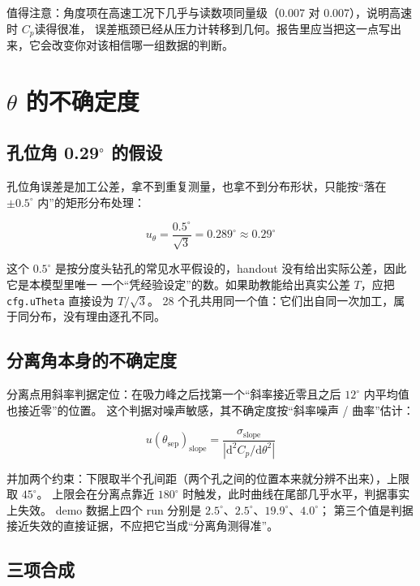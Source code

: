 \documentclass[11pt,a4paper]{ctexart}
\newcommand{\Cp}{\ensuremath{C_p}}
\begin{document}
值得注意：角度项在高速工况下几乎与读数项同量级（0.007 对 0.007），说明高速时 \Cp 读得很准，
误差瓶颈已经从压力计转移到几何。报告里应当把这一点写出来，它会改变你对该相信哪一组数据的判断。

\section{$\theta$ 的不确定度}
\label{sec:theta}

\subsection{孔位角 0.29$^\circ$ 的假设}

孔位角误差是加工公差，拿不到重复测量，也拿不到分布形状，只能按“落在 $\pm0.5^\circ$ 内”的矩形分布处理：

\begin{equation}
u_\theta = \frac{0.5^\circ}{\sqrt{3}} = 0.289^\circ \approx 0.29^\circ
\end{equation}

这个 $0.5^\circ$ 是按分度头钻孔的常见水平假设的，handout 没有给出实际公差，因此它是本模型里唯一
一个“凭经验设定”的数。如果助教能给出真实公差 $T$，应把 \texttt{cfg.uTheta} 直接设为 $T/\sqrt{3}$。
28 个孔共用同一个值：它们出自同一次加工，属于同分布，没有理由逐孔不同。

\subsection{分离角本身的不确定度}

分离点用斜率判据定位：在吸力峰之后找第一个“斜率接近零且之后 $12^\circ$ 内平均值也接近零”的位置。
这个判据对噪声敏感，其不确定度按“斜率噪声 / 曲率”估计：

\begin{equation}
u(\theta_{\text{sep}})_{\text{slope}} = \frac{\sigma_{\text{slope}}}{|\mathrm{d}^2 \Cp/\mathrm{d}\theta^2|}
\end{equation}

并加两个约束：下限取半个孔间距（两个孔之间的位置本来就分辨不出来），上限取 $45^\circ$。
上限会在分离点靠近 $180^\circ$ 时触发，此时曲线在尾部几乎水平，判据事实上失效。
demo 数据上四个 run 分别是 $2.5^\circ$、$2.5^\circ$、$19.9^\circ$、$4.0^\circ$；
第三个值是判据接近失效的直接证据，不应把它当成“分离角测得准”。

\subsection{三项合成}
\end{document}
